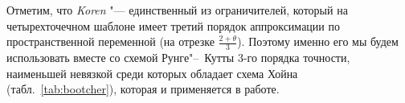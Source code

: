 \documentclass[a4paper,10pt]{article}
\begin{document}
Отметим, что \textit{Koren} "--- единственный из ограничителей, который на четырехточечном шаблоне имеет третий порядок аппроксимации по пространственной переменной
(на отрезке \( \frac{2+\theta}{3} \)). Поэтому именно его мы будем использовать вместе со схемой Рунге"--~Кутты 3-го порядка точности,
наименьшей невязкой среди которых обладает схема Хойна (табл.~\ref{tab:bootcher}), которая и применяется в работе.

\section*{}
\begin{figure}
	\\
	\\
	\\

\end{figure}
\end{document}
